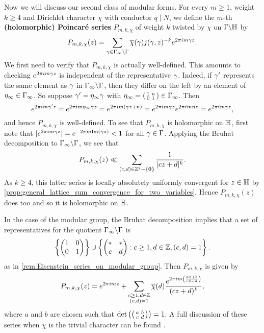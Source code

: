       Now we will discuss our second class of modular forms. For every $m \ge 1$, weight $k \ge 4$ and Dirichlet character $\chi$ with conductor $q \mid N$, we define the $m$-th \textbf{(holomorphic) Poincar\'e series} $P_{m,k,\chi}$ of weight $k$ twisted by $\chi$ on $\Gamma\backslash\mathbb{H}$ by
      \[
        P_{m,k,\chi}(z) = \sum_{\gamma \in \Gamma_{\infty}\backslash\Gamma}\overline{\chi}(\gamma)j(\gamma,z)^{-k}e^{2\pi im\gamma z}.
      \]
      We first need to verify that $P_{m,k,\chi}$ is actually well-defined. This amounts to checking $e^{2\pi im\gamma z}$ is independent of the representative $\gamma$. Indeed, if $\gamma'$ represents the same element as $\gamma$ in $\Gamma_{\infty}\backslash\Gamma$, then they differ on the left by an element of $\eta_{\infty} \in \Gamma_{\infty}$. So suppose $\gamma' = \eta_{\infty}\gamma$ with $\eta_{\infty} = \begin{psmallmatrix} 1 & n \\ 0 & 1 \end{psmallmatrix} \in \Gamma_{\infty}$. Then
      \[
        e^{2\pi im\gamma' z} = e^{2\pi im\eta_{\infty}\gamma z} = e^{2\pi im(\gamma z+n)} = e^{2\pi im\gamma z}e^{2\pi imnz} = e^{2\pi im\gamma z},
      \]
      and hence $P_{m,k,\chi}$ is well-defined. To see that $P_{m,k,\chi}$ is holomorphic on $\mathbb{H}$, first note that $|e^{2\pi im\gamma z}| = e^{-2\pi m\mathrm{Im}(\gamma z)} < 1$ for all $\gamma \in \Gamma$. Applying the Bruhat decomposition to $\Gamma_{\infty}\backslash\Gamma$, we see that
      \[
        P_{m,k,\chi}(z) \ll \sum_{(c,d) \in \mathbb{Z}^{2}-\{\mathbf{0}\}}\frac{1}{|cz+d|^{k}}.
      \]
      As $k \ge 4$, this latter series is locally absolutely uniformly convergent for $z \in \mathbb{H}$ by \cref{prop:general_lattice_sum_convergence_for_two_variables}. Hence $P_{m,k,\chi}(z)$ does too and so it is holomorphic on $\mathbb{H}$.

      \begin{remark}
        In the case of the modular group, the Bruhat decomposition implies that a set of representatives for the quotient $\Gamma_{\infty}\backslash\Gamma$ is
      \[
        \left\{\begin{pmatrix} 1 & 0 \\ 0 & 1 \end{pmatrix}\right\} \cup \left\{\begin{pmatrix} \ast & \ast \\ c & d \end{pmatrix}:c \ge 1, d \in \mathbb{Z}, (c,d) = 1\right\}.
      \]
      as in \cref{rem:Eisenstein_series_on_modular_group}. Then $P_{m,k,\chi}$ is given by
        \[
          P_{m,k,\chi}(z) = e^{2\pi imz}+\sum_{\substack{c \ge 1, d \in \mathbb{Z} \\ (c,d) = 1}}\overline{\chi}(d)\frac{e^{2\pi im\left(\frac{az+b}{cz+d}\right)}}{(cz+d)^{k}},
        \]
        where $a$ and $b$ are chosen such that $\det\left(\begin{psmallmatrix} a & b \\ c & d \end{psmallmatrix}\right) = 1$. A full discussion of these series when $\chi$ is the trivial character can be found \cite{snowden2016lectures}.
      \end{remark}

